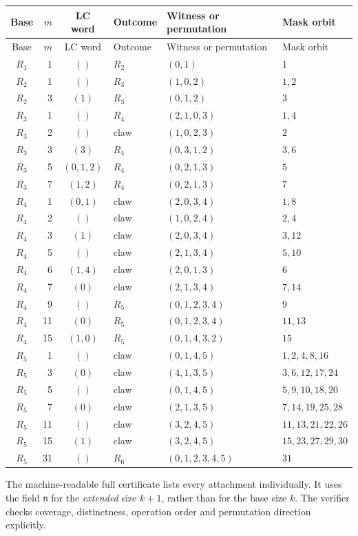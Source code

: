 \documentclass[11pt,letterpaper]{article}
\begin{document}
\small
\begin{longtable}{@{}crclll@{}}
\toprule
Base & $m$ & LC word & Outcome & Witness or permutation & Mask orbit\\\midrule
\endfirsthead
\toprule
Base & $m$ & LC word & Outcome & Witness or permutation & Mask orbit\\\midrule
\endhead
$R_1$ & 1 & $()$ & $R_2$ & $(0,1)$ & $1$ \\
$R_2$ & 1 & $()$ & $R_3$ & $(1,0,2)$ & $1,2$ \\
$R_2$ & 3 & $(1)$ & $R_3$ & $(0,1,2)$ & $3$ \\
$R_3$ & 1 & $()$ & $R_4$ & $(2,1,0,3)$ & $1,4$ \\
$R_3$ & 2 & $()$ & claw & $(1,0,2,3)$ & $2$ \\
$R_3$ & 3 & $(3)$ & $R_4$ & $(0,3,1,2)$ & $3,6$ \\
$R_3$ & 5 & $(0,1,2)$ & $R_4$ & $(0,2,1,3)$ & $5$ \\
$R_3$ & 7 & $(1,2)$ & $R_4$ & $(0,2,1,3)$ & $7$ \\
$R_4$ & 1 & $(0,1)$ & claw & $(2,0,3,4)$ & $1,8$ \\
$R_4$ & 2 & $()$ & claw & $(1,0,2,4)$ & $2,4$ \\
$R_4$ & 3 & $(1)$ & claw & $(2,0,3,4)$ & $3,12$ \\
$R_4$ & 5 & $()$ & claw & $(2,1,3,4)$ & $5,10$ \\
$R_4$ & 6 & $(1,4)$ & claw & $(2,0,1,3)$ & $6$ \\
$R_4$ & 7 & $(0)$ & claw & $(2,1,3,4)$ & $7,14$ \\
$R_4$ & 9 & $()$ & $R_5$ & $(0,1,2,3,4)$ & $9$ \\
$R_4$ & 11 & $(0)$ & $R_5$ & $(0,1,2,3,4)$ & $11,13$ \\
$R_4$ & 15 & $(1,0)$ & $R_5$ & $(0,1,4,3,2)$ & $15$ \\
$R_5$ & 1 & $()$ & claw & $(0,1,4,5)$ & $1,2,4,8,16$ \\
$R_5$ & 3 & $(0)$ & claw & $(4,1,3,5)$ & $3,6,12,17,24$ \\
$R_5$ & 5 & $()$ & claw & $(0,1,4,5)$ & $5,9,10,18,20$ \\
$R_5$ & 7 & $(0)$ & claw & $(2,1,3,5)$ & $7,14,19,25,28$ \\
$R_5$ & 11 & $()$ & claw & $(3,2,4,5)$ & $11,13,21,22,26$ \\
$R_5$ & 15 & $(1)$ & claw & $(3,2,4,5)$ & $15,23,27,29,30$ \\
$R_5$ & 31 & $()$ & $R_6$ & $(0,1,2,3,4,5)$ & $31$ \\
\bottomrule
\end{longtable}
\normalsize
The machine-readable full certificate lists every attachment individually. It uses the field \texttt{n} for the \emph{extended} size $k+1$, rather than for the base size $k$. The verifier checks coverage, distinctness, operation order and permutation direction explicitly.
\end{document}

